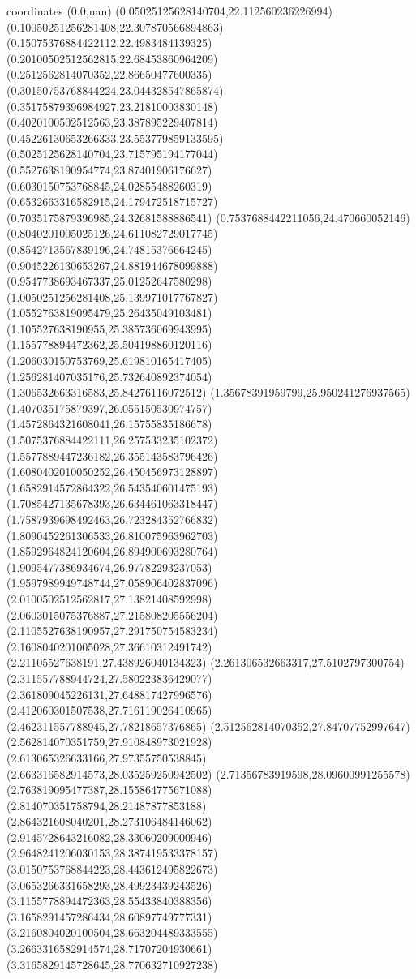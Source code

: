 coordinates {%
(0.0,nan)
(0.05025125628140704,22.112560236226994)
(0.10050251256281408,22.307870566894863)
(0.15075376884422112,22.4983484139325)
(0.20100502512562815,22.68453860964209)
(0.2512562814070352,22.86650477600335)
(0.30150753768844224,23.044328547865874)
(0.35175879396984927,23.21810003830148)
(0.4020100502512563,23.387895229407814)
(0.45226130653266333,23.553779859133595)
(0.5025125628140704,23.715795194177044)
(0.5527638190954774,23.87401906176627)
(0.6030150753768845,24.02855488260319)
(0.6532663316582915,24.179472518715727)
(0.7035175879396985,24.32681588886541)
(0.7537688442211056,24.470660052146)
(0.8040201005025126,24.611082729017745)
(0.8542713567839196,24.74815376664245)
(0.9045226130653267,24.881944678099888)
(0.9547738693467337,25.01252647580298)
(1.0050251256281408,25.139971017767827)
(1.0552763819095479,25.26435049103481)
(1.105527638190955,25.385736069943995)
(1.155778894472362,25.504198860120116)
(1.206030150753769,25.619810165417405)
(1.256281407035176,25.732640892374054)
(1.306532663316583,25.84276116072512)
(1.35678391959799,25.950241276937565)
(1.407035175879397,26.055150530974757)
(1.4572864321608041,26.15755835186678)
(1.5075376884422111,26.257533235102372)
(1.5577889447236182,26.355143583796426)
(1.6080402010050252,26.450456973128897)
(1.6582914572864322,26.543540601475193)
(1.7085427135678393,26.634461063318447)
(1.7587939698492463,26.723284352766832)
(1.8090452261306533,26.810075963962703)
(1.8592964824120604,26.894900693280764)
(1.9095477386934674,26.97782293237053)
(1.9597989949748744,27.058906402837096)
(2.0100502512562817,27.13821408592998)
(2.0603015075376887,27.215808205556204)
(2.1105527638190957,27.291750754583234)
(2.1608040201005028,27.36610312491742)
(2.21105527638191,27.438926040134323)
(2.261306532663317,27.5102797300754)
(2.311557788944724,27.580223836429077)
(2.361809045226131,27.648817427996576)
(2.412060301507538,27.716119026410965)
(2.462311557788945,27.78218657376865)
(2.512562814070352,27.84707752997647)
(2.562814070351759,27.910848973021928)
(2.613065326633166,27.97355750538845)
(2.663316582914573,28.035259250942502)
(2.71356783919598,28.09600991255578)
(2.763819095477387,28.155864775671088)
(2.814070351758794,28.21487877853188)
(2.864321608040201,28.273106484146062)
(2.9145728643216082,28.33060209000946)
(2.9648241206030153,28.387419533378157)
(3.0150753768844223,28.443612495822673)
(3.0653266331658293,28.49923439243526)
(3.1155778894472363,28.55433840388356)
(3.1658291457286434,28.60897749777331)
(3.2160804020100504,28.663204489333555)
(3.2663316582914574,28.71707204930661)
(3.3165829145728645,28.770632710927238)
}

